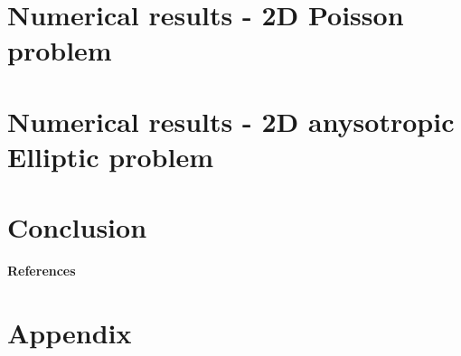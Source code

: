 \documentclass[compress,10pt,xcolor={table,dvipsnames},t]{beamer}
\begin{document}
	\section{Numerical results - 2D Poisson problem}
	

	\section{Numerical results - 2D anysotropic Elliptic problem}
	

	\section{Conclusion}
	
	
	{ 	
		\begin{frame}{}
			\vspace{18pt}
			\normalsize
			\textbf{References}
			\small
			
		\end{frame}
	}
	\addtocounter{framenumber}{-1} 
	
	\appendix
	
	\section{Appendix}
	
	
\end{document}
